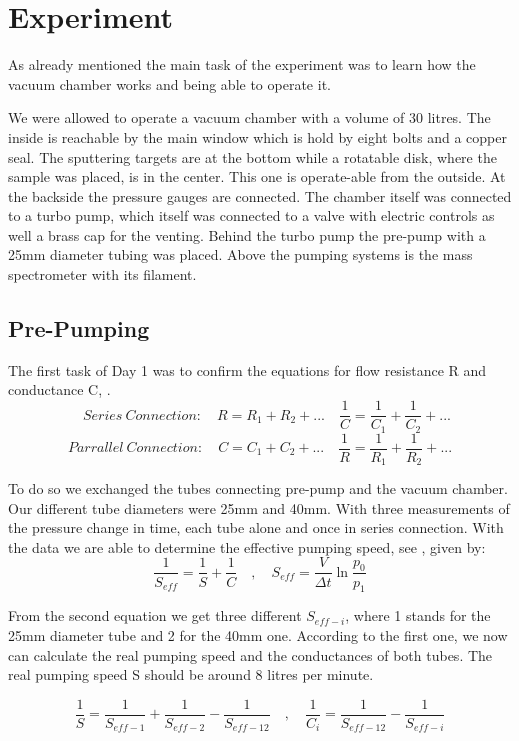 \documentclass[]{article}
\begin{document}
\newpage
\section{Experiment}
As already mentioned the main task of the experiment was to learn how the vacuum chamber works and being able to operate it. 

We were allowed to operate a vacuum chamber with a volume of 30 litres. The inside is reachable by the main window which is hold by eight bolts and a copper seal. The sputtering targets are at the bottom while a rotatable disk, where the sample was placed, is in the center. This one is operate-able from the outside. At the backside the pressure gauges are connected. 
The chamber itself was connected to a turbo pump, which itself was connected to a valve with electric controls as well a brass cap for the venting. Behind the turbo pump the pre-pump with a 25mm diameter tubing was placed. Above the pumping systems is the mass spectrometer with its filament.

\subsection{Pre-Pumping}
The first task of Day 1 was to confirm the equations for flow resistance R and conductance C, \cite[Page 91]{VacuumHandbook}. 
\[ \quad Series \: Connection: \quad
R = R_1 + R_2 + ...  \quad \frac{1}{C} = \frac{1}{C_1} + \frac{1}{C_2} + ... \]
\[ Parrallel \: Connection: \quad
C = C_1 + C_2 + ...  \quad \frac{1}{R} = \frac{1}{R_1} + \frac{1}{R_2} + ... \]

To do so we exchanged the tubes connecting pre-pump and the vacuum chamber. Our different tube diameters were 25mm and 40mm. With three measurements of the pressure change in time, each tube alone and once in series connection. With the data we are able to determine the effective pumping speed, see \cite[Page 93]{VacuumHandbook}, given by:
\[ \frac{1}{S_{eff}} = \frac{1}{S} + \frac{1}{C} \quad , \quad
S_{eff} = \frac{V}{\Delta t} \ln{ \frac{p_0}{p_1} } \]

From the second equation we get three different $S_{eff-i}$, where 1 stands for the 25mm diameter tube and 2 for the 40mm one. According to the first one, we now can calculate the real pumping speed and the conductances of both tubes. The real pumping speed S should be around 8 litres per minute.

\[ \frac{1}{S} = \frac{1}{S_{eff-1}} + \frac{1}{S_{eff-2}} -\frac{1}{S_{eff-12}} \quad , \quad
\frac{1}{C_i} = \frac{1}{S_{eff-12}} - \frac{1}{S_{eff-i}} \]
\end{document}
